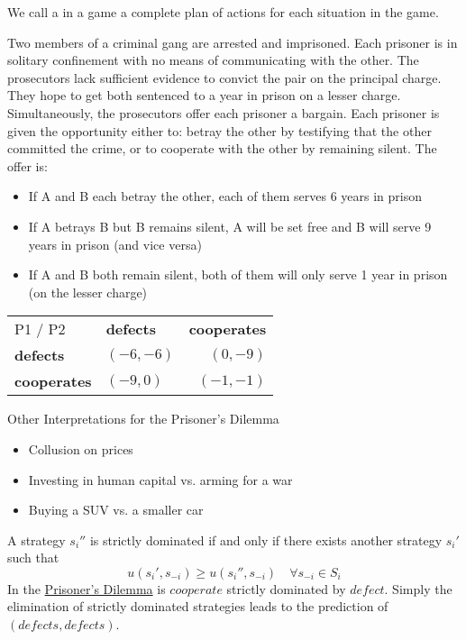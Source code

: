 We call a  in a game a complete plan of actions for each situation in the game.

\begin{example} \label{prisonersdilemma}
Two members of a criminal gang are arrested and imprisoned. Each prisoner is in solitary confinement with no means of communicating with the other. The prosecutors lack sufficient evidence to convict the pair on the principal charge. They hope to get both sentenced to a year in prison on a lesser charge. Simultaneously, the prosecutors offer each prisoner a bargain. Each prisoner is given the opportunity either to: betray the other by testifying that the other committed the crime, or to cooperate with the other by remaining silent. The offer is:
	\begin{itemize}
		\item If A and B each betray the other, each of them serves 6 years in prison
		\item If A betrays B but B remains silent, A will be set free and B will serve 9 years in prison (and vice versa)
		\item If A and B both remain silent, both of them will only serve 1 year in prison (on the lesser charge)
	\end{itemize}
	
\begin{center}
	\begin{tabular}{|l|l|r|}
		\hline\hline
  			P1 / P2 & \textbf{defects} & \textbf{cooperates} \\
         		\cline{1-3}
   			\textbf{defects} & $(-6, -6)$ & $(0, -9)$ 	\arrayrulewidth2pt \\
            	\cline{1-3}
   			\textbf{cooperates} & $(-9, 0)$ & $(-1, -1)$ \\ \hline\hline
	\end{tabular}	
\end{center}


	Other Interpretations for the Prisoner's Dilemma
	\begin{itemize}
		\item Collusion on prices
		\item Investing in human capital vs. arming for a war
		\item Buying a SUV vs. a smaller car
	\end{itemize}
\end{example}

\begin{definition*}
	A strategy $s_{i}''$ is strictly dominated if and only if there exists another strategy $s_{i}'$ such that
	\[ u(s_{i}', s_{-i}) \geq u(s_{i}'', s_{-i}) \quad \forall s_{-i} \in S_{i} \]	
	In the \hyperref[prisonersdilemma]{Prisoner's Dilemma} is $cooperate$ strictly dominated by $defect$. Simply the elimination of strictly dominated strategies leads to the prediction of $(defects, defects)$.
\end{definition*}

